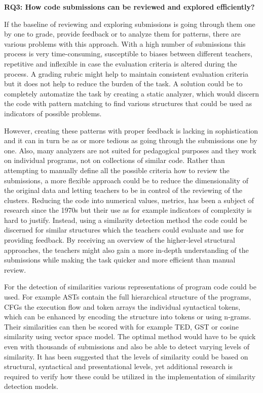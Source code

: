 \bigskip
\noindent
\textbf{RQ3: How code submissions can be reviewed and explored efficiently?}
\bigskip

\noindent
If the baseline of reviewing and exploring submissions is going through them one by one to grade, provide feedback or to analyze them for patterns, there are various problems with this approach. With a high number of submissions this process is very time-consuming, susceptible to biases between different teachers, repetitive and inflexible in case the evaluation criteria is altered during the process. A grading rubric might help to maintain consistent evaluation criteria but it does not help to reduce the burden of the task. A solution could be to completely automatize the task by creating a static analyzer, which would discern the code with pattern matching to find various structures that could be used as indicators of possible problems.

However, creating these patterns with proper feedback is lacking in sophistication and it can in turn be as or more tedious as going through the submissions one by one. Also, many analyzers are not suited for pedagogical purposes and they work on individual programs, not on collections of similar code. Rather than attempting to manually define all the possible criteria how to review the submissions, a more flexible approach could be to reduce the dimensionality of the original data and letting teachers to be in control of the reviewing of the clusters. Reducing the code into numerical values, metrics, has been a subject of research since the 1970s but their use as for example indicators of complexity is hard to justify\cite{halstead-1972, mccabe-1976, cc-is-loc, shepperd-cc-1988}. Instead, using a similarity detection method the code could be discerned for similar structures which the teachers could evaluate and use for providing feedback. By receiving an overview of the higher-level structural approaches, the teachers might also gain a more in-depth understanding of the submissions while making the task quicker and more efficient than manual review.

For the detection of similarities various representations of program code could be used. For example ASTs contain the full hierarchical structure of the programs, CFGs the execution flow and token arrays the individual syntactical tokens, which can be enhanced by encoding the structure into tokens or using n-grams. Their similarities can then be scored with for example TED, GST or cosine similarity using vector space model. The optimal method would have to be quick even with thousands of submissions and also be able to detect varying levels of similarity. It has been suggested that the levels of similarity could be based on structural, syntactical and presentational levels\cite{luxton-sub-variation-2013}, yet additional research is required to verify how these could be utilized in the implementation of similarity detection models.

